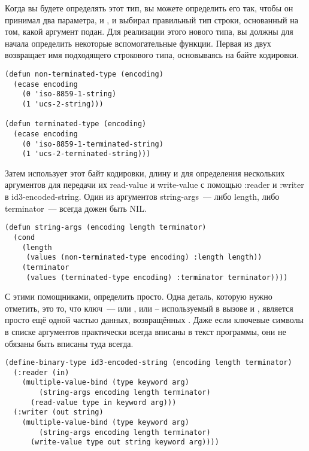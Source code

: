 Когда вы будете определять этот тип, вы можете определить его так, чтобы он принимал два
параметра,  и , и выбирал правильный тип строки,
основанный на том, какой аргумент подан. Для реализации этого нового типа, вы должны для
начала определить некоторые вспомогательные функции. Первая из двух возвращает имя
подходящего строкового типа, основываясь на байте кодировки.

\begin{lstlisting}
(defun non-terminated-type (encoding)
  (ecase encoding
    (0 'iso-8859-1-string)
    (1 'ucs-2-string)))

(defun terminated-type (encoding)
  (ecase encoding
    (0 'iso-8859-1-terminated-string)
    (1 'ucs-2-terminated-string)))
\end{lstlisting}

Затем  использует этот байт кодировки, длину и  для
определения нескольких аргументов для передачи их read-value и write-value с помощью
:reader и :writer в id3-encoded-string. Один из аргументов string-args~--- либо length,
либо terminator~--- всегда дожен быть NIL.

\begin{lstlisting}
(defun string-args (encoding length terminator)
  (cond 
    (length
     (values (non-terminated-type encoding) :length length))
    (terminator
     (values (terminated-type encoding) :terminator terminator))))
\end{lstlisting}

С этими помощниками, определить  просто. Одна деталь, которую
нужно отметить, это то, что ключ~--- или , или  --
используемый в вызове  и , является просто ещё одной
частью данных, возвращённых . Даже если ключевые символы в списке
аргументов практически всегда вписаны в текст программы, они не обязаны быть вписаны туда
всегда.

\begin{lstlisting}
(define-binary-type id3-encoded-string (encoding length terminator)
  (:reader (in) 
    (multiple-value-bind (type keyword arg)
        (string-args encoding length terminator)
      (read-value type in keyword arg)))
  (:writer (out string)
    (multiple-value-bind (type keyword arg)
        (string-args encoding length terminator)
      (write-value type out string keyword arg))))
\end{lstlisting}

